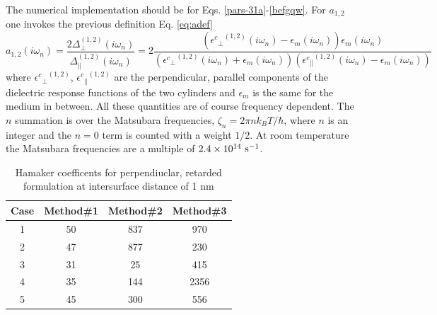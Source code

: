 \documentclass[onecolumn,letterpaper,amsmath,amssymb,floatfix,aps,superscriptaddress]{revtex4}
\begin{document}
The numerical implementation should be for Eqs. \ref{pars-31a}-\ref{befgqw}. For $a_{1,2}$ one invokes the previous definition Eq. \ref{eq:adef}
\begin{equation}
a_{1,2}(i \omega_n) = \frac{2 \Delta_{\perp}^{(1,2)}(i \omega_n)}{\Delta_{\parallel}^{(1,2)}(i \omega_n)} = 2 \frac{({{\epsilon^{c}}_{\perp}}^{(1,2)}(i \omega_n) -\epsilon_{m}(i \omega_n)) \epsilon_{m}(i \omega_n)}{({{\epsilon^{c}}_{\perp}}^{(1,2)}(i \omega_n)+\epsilon_{m}(i \omega_n)) ({{\epsilon^{c}}_{\parallel}}^{(1,2)}(i \omega_n) -\epsilon_{m}(i \omega_n))}
\label{eq:adef}
\end{equation}
where ${{\epsilon^{c}}_{\perp}}^{(1,2)}$, ${{\epsilon^{c}}_{\parallel}}^{(1,2)}$ are the perpendicular, parallel components of the dielectric response functions of the two cylinders and $\epsilon_{m}$ is the same for the medium in between. All these quantities are of course frequency dependent. The $n$ summation is over the Matsubara frequencies, $\zeta_n = 2\pi n k_BT/\hbar$, where $n$ is an integer and the $n=0$ term is counted with a weight $1/2$. At room temperature the Matsubara frequencies are a multiple of $\rm 2.4 \times 10^{14}~s^{-1}$.

\begin{table}[ht]
\caption{Hamaker coefficents for perpendiuclar, retarded formulation at
intersurface distance of 1 nm}%
\centering
\begin{tabular}{c c c c}
\hline\hline
Case & Method\#1 & Method\#2 & Method\#3 \\ [0.5ex]
\hline
1 & 50 & 837 & 970 \\
2 & 47 & 877 & 230 \\
3 & 31 & 25 & 415 \\
4 & 35 & 144 & 2356 \\
5 & 45 & 300 & 556 \\ [1ex]
\hline
\end{tabular}
\label{table:nonlin}

\end{table}
\end{document}
